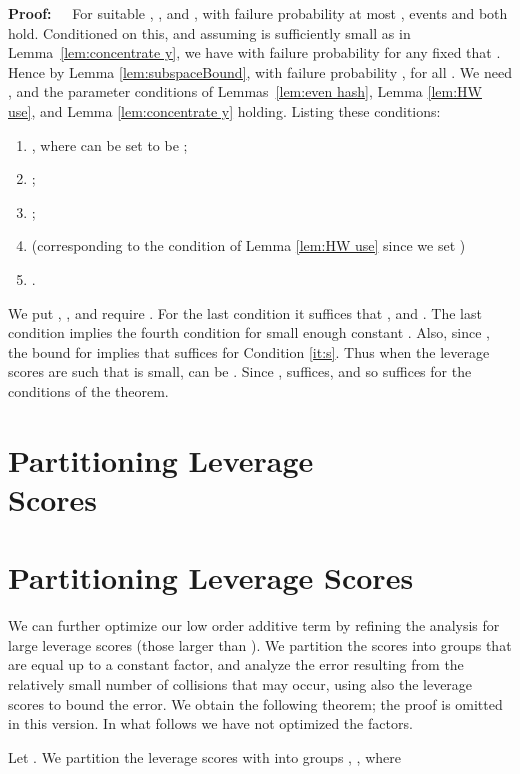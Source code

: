 \documentclass{sig-alternate}
\def\FullBox{\hbox{\vrule width 8pt height 8pt depth 0pt}}
\def\qed{\ifmmode\qquad\FullBox\else{\unskip\nobreak\hfil
\penalty50\hskip1em\null\nobreak\hfil\FullBox
\parfillskip=0pt\finalhyphendemerits=0\endgraf}\fi}
\newenvironment{proof}{\begin{trivlist} \item {\bf Proof:~~}}
  {\qed\end{trivlist}}
\begin{document}
\begin{proof}
For suitable , , and ,
with failure probability at most , events  and  both hold.
Conditioned on this, and assuming  is sufficiently small as in Lemma~\ref{lem:concentrate y},
we have with failure probability  for any fixed  that .
Hence by Lemma \ref{lem:subspaceBound}, with failure probability
, 
 for all .
We need , and the parameter conditions of Lemmas~\ref{lem:even hash}, 
Lemma \ref{lem:HW use}, and Lemma \ref{lem:concentrate y} holding. Listing these conditions:
\begin{enumerate}
\item , where  can be set to be ;
\item ;
\item \label{it:s} ;
\item  (corresponding to the condition  of Lemma \ref{lem:HW use} 
since we set )
\item .
\end{enumerate}
We put , , and require .
For the last condition it suffices that ,
and . The last condition implies the fourth condition for small enough constant . 
Also, since ,
the bound for  implies that  suffices for Condition \ref{it:s}.
Thus when the leverage scores are such that
 is small,  can be .
Since ,  suffices, and so 
suffices for the conditions of the theorem.
\end{proof}





\ifSTOC
\section{Partitioning Leverage\\ Scores}\label{sec:partition}
\else
\section{Partitioning Leverage Scores}\label{sec:partition}
\fi
We can further optimize our low order additive  term by refining the analysis for large leverage scores (those larger than ). 
We partition the scores into groups that are equal up to a constant factor, and analyze the error resulting from the 
relatively small number of collisions that may occur, using also the leverage scores to bound the error.
\ifSTOC
We obtain the following theorem; the proof is omitted in this version.
\else
 In what follows we 
have not optimized the  factors. 

Let . 
We partition the leverage scores  with  into
groups , , where
\end{document}
